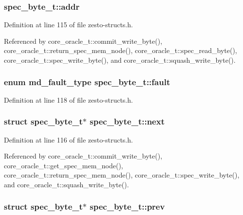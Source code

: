 \subsubsection[{addr}]{ {\bf spec\_\-byte\_\-t::addr}}\label{structspec__byte__t_1e4c15a23513fc4f753a0154527c84c8}




Definition at line 115 of file zesto-structs.h.

Referenced by core\_\-oracle\_\-t::commit\_\-write\_\-byte(), core\_\-oracle\_\-t::return\_\-spec\_\-mem\_\-node(), core\_\-oracle\_\-t::spec\_\-read\_\-byte(), core\_\-oracle\_\-t::spec\_\-write\_\-byte(), and core\_\-oracle\_\-t::squash\_\-write\_\-byte().
\subsubsection[{fault}]{\setlength{\rightskip}{0pt plus 5cm}enum {\bf md\_\-fault\_\-type} {\bf spec\_\-byte\_\-t::fault}}\label{structspec__byte__t_338e196dff547713df3a5f7fc28490e5}




Definition at line 118 of file zesto-structs.h.
\subsubsection[{next}]{\setlength{\rightskip}{0pt plus 5cm}struct {\bf spec\_\-byte\_\-t}$\ast$ {\bf spec\_\-byte\_\-t::next}\hspace{0.3cm}{\tt  [read]}}\label{structspec__byte__t_4ace439424a3531bff054f699d865679}




Definition at line 116 of file zesto-structs.h.

Referenced by core\_\-oracle\_\-t::commit\_\-write\_\-byte(), core\_\-oracle\_\-t::get\_\-spec\_\-mem\_\-node(), core\_\-oracle\_\-t::return\_\-spec\_\-mem\_\-node(), core\_\-oracle\_\-t::spec\_\-write\_\-byte(), and core\_\-oracle\_\-t::squash\_\-write\_\-byte().
\subsubsection[{prev}]{\setlength{\rightskip}{0pt plus 5cm}struct {\bf spec\_\-byte\_\-t}$\ast$ {\bf spec\_\-byte\_\-t::prev}\hspace{0.3cm}{\tt  [read]}}\label{structspec__byte__t_65843e255c19ee4684c0273cc1d65443}




